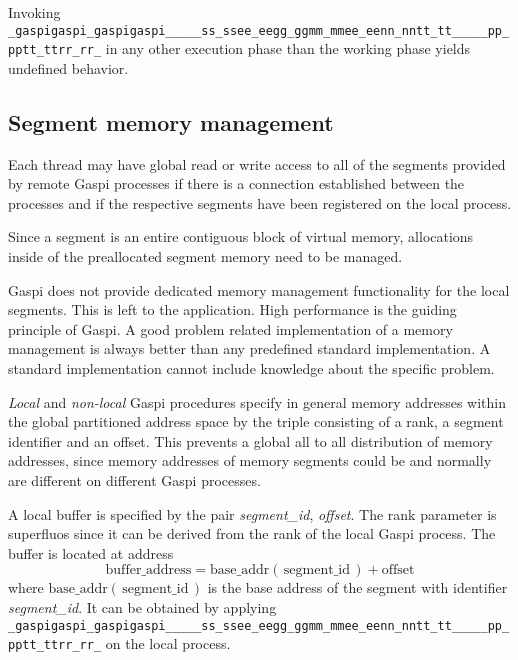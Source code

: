 \documentclass{article}
\makeatletter
\newlength{\lw}\setlength{\lw}{0.4pt}
\newlength{\st}\setlength{\st}{0pt}
\newcommand{\zerowsep}{\hskip 0pt plus 0.1pt minus 0.1pt}
\newcommand{\ZSEP}[1]{\ifx#1\@@@EOZ@@@\let\next\relax\else\ifx#1\_#1\zerowsep\else#1\fi\let\next\ZSEP\fi\next}
\newcommand{\zsep}[1]{\ZSEP{}#1\@@@EOZ@@@}
\newcommand{\gaspiprefix}{gaspi}
\newcommand{\GASPI}{{\sc Gaspi}}
\newcommand{\function}[1]{{\tt #1}}
\newcommand{\parameter}[1]{{\it #1}}
\newcommand{\gaspifunction}[1]{\function{\protect\zsep{\gaspiprefix\_#1}}}
\newcommand{\gaspisemantic}[1]{{\emph{#1}}}
\makeatother
\begin{document}
Invoking \gaspifunction{segment\_ptr} in any other execution phase than the
working phase yields undefined behavior.

\subsection{Segment memory management}

Each thread may have global read or write access to all of
the segments provided by remote \GASPI{} processes if there
is a connection established between the processes and if the
respective segments have been registered on the local process.

Since a segment is an entire contiguous block of virtual memory,
allocations inside of the preallocated segment memory need to be
managed.

\GASPI{} does not provide dedicated memory management functionality
for the local segments. This is left to the application.
High performance is the guiding principle of \GASPI{}.
A good problem related implementation of a memory management is always better
than any predefined standard implementation. A standard implementation cannot
include knowledge about the specific problem.

\gaspisemantic{Local} and \gaspisemantic{non-local} \GASPI{} procedures
specify in general memory addresses within the global partitioned address space by
the triple consisting of a rank, a segment identifier and
an offset.  This prevents a global all to all distribution of memory
addresses, since memory addresses of memory segments could be and
normally are different on different \GASPI{} processes.

A local buffer is specified by the pair \parameter{segment\_id}, \parameter{offset}.
The rank parameter is superfluos since it can be derived from the rank of the local \GASPI{} process.
The buffer  is located at address
\begin{equation}
\mbox{buffer\_address} = \mbox{base\_addr}\left(\, \mbox{segment\_id} \,\right) + \mbox{offset} \nonumber
\end{equation}
where $\mbox{base\_addr}(\, \mbox{segment\_id} \,)$ is the base address of the segment with identifier
\parameter{segment\_id}.
It can be obtained by applying \gaspifunction{segment\_ptr} on the local process.
\end{document}
